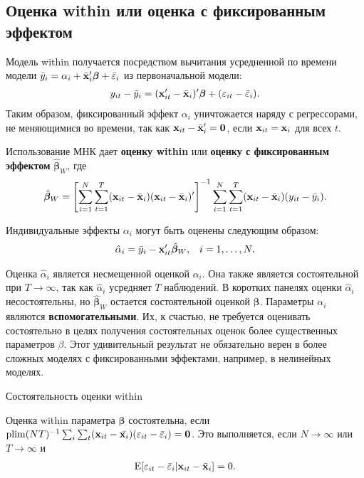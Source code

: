 \subsection{Оценка within или оценка с фиксированным эффектом}

Модель within получается посредством вычитания усредненной по времени модели $\bar{y}_i=\alpha_i+\bar{\mathbf{x}}'_i\bm\beta +\bar{\varepsilon}_i$ из первоначальной модели:
\begin{align}
y_{it}-\bar{y}_i=(\mathbf{x}'_{it}-\bar{\mathbf{x}}_i)'\bm\beta +(\varepsilon_{it}-\bar{\varepsilon}_i).
\label{Eq:21.23}
\end{align}
Таким образом, фиксированный эффект $\alpha_i$ уничтожается наряду с регрессорами, не меняющимися во времени, так как $\mathbf{x}_{it}-\bar{\mathbf{x}}'_i=\mathbf 0$, если $\mathbf{x}_{it}=\mathbf{x}_i$ для всех $t$.

Использование МНК дает \textbf{оценку within} или \textbf{оценку с фиксированным эффектом} $\hat{\bm\beta}_W$, где 
\begin{align}
\hat{\bm\beta}_W=\left[ \sum^N_{i=1} \sum^T_{t=1} (\mathbf{x}_{it}-\bar{\mathbf{x}}_i)(\mathbf{x}_{it}-\bar{\mathbf{x}}_i)'\right]^{-1} \sum^N_{i=1} \sum^T_{t=1} (\mathbf{x}_{it}-\bar{\mathbf{x}}_i)(y_{it}-\bar{y}_i).
\label{Eq:21.24}
\end{align}

 Индивидуальные эффекты $\alpha_i$ могут быть оценены следующим образом:
\begin{align}
&\hat{\alpha}_i=\bar{y}_i-\mathbf{x}'_{it}\hat{\bm\beta}_W, & i=1, \dots, N.
\label{Eq:21.25}
\end{align}

Оценка $\hat{\alpha}_i$ является несмещенной оценкой $\alpha_i$. Она также является состоятельной при $T \rightarrow \infty$, так как $\hat{\alpha}_i$ усредняет $T$  наблюдений. В коротких панелях оценки $\hat{\alpha}_i$ несостоятельны, но $\hat{\bm\beta}_W$ остается состоятельной оценкой $\bm\beta$. Параметры  $\alpha_i$ являются \textbf{вспомогательными}. Их, к счастью, не требуется оценивать состоятельно в целях получения состоятельных оценок более существенных параметров $\beta$. Этот удивительный результат не обязательно верен  в более сложных моделях с фиксированными эффектами, например, в нелинейных моделях.

{\centering
Состоятельность оценки within\\}

Оценка within параметра $\bm\beta$ состоятельна, если  $\mathrm{plim}(NT)^{-1}\sum_i\sum_t(\mathbf{x}_{it}-\bar{\mathbf{x}_i})(\varepsilon_{it}-\bar{\varepsilon}_i)=\mathbf 0$. Это выполняется, если $N \rightarrow \infty$ или $T \rightarrow \infty$ и 
\begin{align}
\mathrm E[\varepsilon_{it}-\bar{\varepsilon}_i|\mathbf{x}_{it}-\bar{\mathbf{x}}_i]=0.
\label{Eq:21.26}
\end{align}
 
